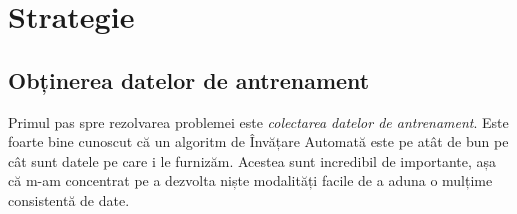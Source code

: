 





\section{Strategie}

\subsection{Obținerea datelor de antrenament}
Primul pas spre rezolvarea problemei este \emph{colectarea datelor de antrenament}.
Este foarte bine cunoscut că un algoritm de Învățare Automată este pe atât de bun pe cât sunt datele pe care i le furnizăm.
Acestea sunt incredibil de importante, așa că m-am concentrat pe a dezvolta niște modalități facile de a aduna o mulțime consistentă de date.

